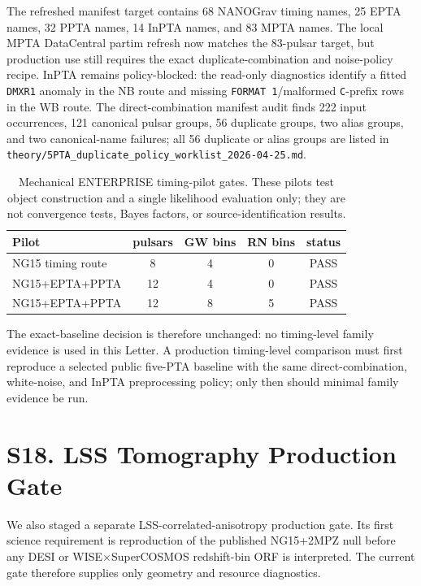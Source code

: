 \documentclass[aps,prl,superscriptaddress,nofootinbib]{revtex4-2}
\begin{document}
The refreshed manifest target contains 68 NANOGrav timing names, 25 EPTA
names, 32 PPTA names, 14 InPTA names, and 83 MPTA names.  The local MPTA
DataCentral partim refresh now matches the 83-pulsar target, but production use
still requires the exact duplicate-combination and noise-policy recipe.  InPTA
remains policy-blocked: the read-only diagnostics identify a fitted
\texttt{DMXR1} anomaly in the NB route and missing \texttt{FORMAT 1}/malformed
\texttt{C}-prefix rows in the WB route.  The direct-combination manifest audit
finds 222 input occurrences, 121 canonical pulsar groups, 56 duplicate groups,
two alias groups, and two canonical-name failures; all 56 duplicate or alias
groups are listed in
\nolinkurl{theory/5PTA_duplicate_policy_worklist_2026-04-25.md}.

\begin{table}[H]
\caption{\label{tab:timing-pilots}Mechanical ENTERPRISE timing-pilot gates.
These pilots test object construction and a single likelihood evaluation only;
they are not convergence tests, Bayes factors, or source-identification
results.}
\begin{ruledtabular}
\begin{tabular}{lcccc}
Pilot & pulsars & GW bins & RN bins & status \\
\hline
NG15 timing route & 8 & 4 & 0 & PASS \\
NG15+EPTA+PPTA & 12 & 4 & 0 & PASS \\
NG15+EPTA+PPTA & 12 & 8 & 5 & PASS \\
\end{tabular}
\end{ruledtabular}
\end{table}

The exact-baseline decision is therefore unchanged: no timing-level family
evidence is used in this Letter.  A production timing-level comparison must
first reproduce a selected public five-PTA baseline with the same
direct-combination, white-noise, and InPTA preprocessing policy; only then
should minimal family evidence be run.

\section*{S18. LSS Tomography Production Gate}

We also staged a separate LSS-correlated-anisotropy production gate.  Its first
science requirement is reproduction of the published NG15+2MPZ null before any
DESI or WISE$\times$SuperCOSMOS redshift-bin ORF is interpreted.  The current
gate therefore supplies only geometry and resource diagnostics.
\end{document}
